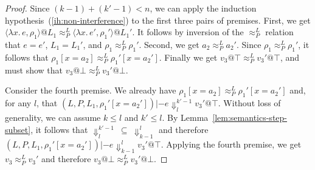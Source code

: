\documentclass{article}
\makeatletter
\theoremstyle{definition}
\newcommand{\at}{\ensuremath{{\scriptstyle{@}}}}
\newcommand{\pc}{\ensuremath{{\mathit{pc}}}}
\makeatother
\begin{document}
\begin{proof}
  Since $(k-1) + (k'-1) < n$, we can apply the induction
  hypothesis~(\ref{ih:non-interference})
  to the first three pairs of premises.
  First, we get
  $\langle{\lambda{x}.\, e, \rho_1\rangle} \at L_1
  \approx^{L}_{P}
  \langle{\lambda{x}.\, e', \rho_1'\rangle} \at L_1'$.
  It follows by inversion of the $\approx^{L}_{P}$ relation that
  $e = e'$, $L_1 = L_1'$, and $\rho_1 \approx^{L}_{P} \rho_1'$.
  Second, we get $a_2 \approx^{L}_{P} a_2'$.
  Since $\rho_1 \approx^{L}_{P} \rho_1'$, it follows that
  $\rho_1[x = a_2] \approx^{L}_{P} \rho_1'[x = a_2']$.
  Finally we get $v_3 \at \top \approx^{L}_{P} v_3' \at \top$,
  and must show that $v_3 \at \bot \approx^{L}_{P} v_3' \at \bot$.

  Consider the fourth premise.
  We already have $\rho_1[x = a_2] \approx^{L}_{P} \rho_1'[x = a_2']$ and,
  for any $l$, that
  $(L, P, L_1, \rho_1'[x = a_2']) |- e
  \Downarrow^{k'-1}_{l} v_3' \at \top$.
  Without loss of generality, we can assume $k \leq l$ and $k' \leq l$.
  By Lemma~\ref{lem:semantics-step-subset}, it follows that
  $\Downarrow^{k'-1}_{l}\ \subseteq\ \Downarrow^{l}_{k-1}$ and therefore
  $(L, P, L_1, \rho_1'[x = a_2']) |- e \Downarrow^{l}_{k-1}
  v_3' \at \top$. Applying the fourth premise, we get
  $v_3 \approx^{L}_{P} v_3'$ and therefore
  $v_3 \at \bot \approx^{L}_{P} v_3' \at \bot$.

\end{proof}
\end{document}
